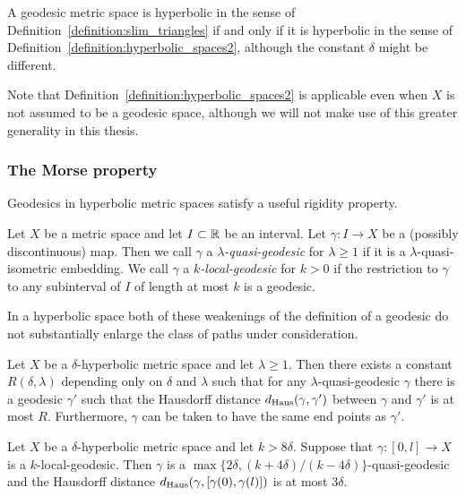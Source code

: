 \begin{proposition}
  A geodesic metric space is hyperbolic in the sense of Definition~\ref{definition:slim_triangles} if and only if it is hyperbolic in the sense of Definition~\ref{definition:hyperbolic_spaces2}, although the constant $\delta$ might be different.
\end{proposition}

Note that Definition~\ref{definition:hyperbolic_spaces2} is applicable even when $X$ is not assumed to be a geodesic space, although we will not make use of this greater generality in this thesis.

\subsubsection{The Morse property}

Geodesics in hyperbolic metric spaces satisfy a useful rigidity property.

\begin{definition}
  Let $X$ be a metric space and let $I \subset \mathbb{R}$ be an interval.
  Let $\gamma \colon I \to X$ be a (possibly discontinuous) map.
  Then we call $\gamma$ a \emph{$\lambda$-quasi-geodesic} for $\lambda \geq 1$ if it is a $\lambda$-quasi-isometric embedding.
  We call $\gamma$ a \emph{$k$-local-geodesic} for $k > 0$ if the restriction to $\gamma$ to any subinterval of $I$ of length at most $k$ is a geodesic.
\end{definition}

In a hyperbolic space both of these weakenings of the definition of a geodesic do not substantially enlarge the class of paths under consideration.

\begin{theorem}\cite[Theorem III.H.1.7]{bridsonhaefliger99}
  \label{theorem:morse_property}
  Let $X$ be a $\delta$-hyperbolic metric space and let $\lambda \geq 1$.
  Then there exists a constant $R(\delta,\lambda)$ depending only on $\delta$ and $\lambda$ such that for any $\lambda$-quasi-geodesic $\gamma$ there is a geodesic $\gamma'$ such that the Hausdorff distance $d_{\operatorname{Haus}}(\gamma, \gamma')$ between $\gamma$ and $\gamma'$ is at most $R$.
  Furthermore, $\gamma$ can be taken to have the same end points as $\gamma'$.
\end{theorem}

\begin{theorem}\label{theorem:local_geodesics}\cite[Theorem III.H.1.13]{bridsonhaefliger99}
  Let $X$ be a $\delta$-hyperbolic metric space and let $k > 8\delta$.
  Suppose that $\gamma \colon [0,l] \to X$ is a $k$-local-geodesic.
  Then $\gamma$ is a $\max\{2\delta, (k+4\delta)/(k-4\delta)\}$-quasi-geodesic and the Hausdorff distance $d_{\operatorname{Haus}}(\gamma, [\gamma(0), \gamma(l)])$ is at most $3\delta$.
\end{theorem}

